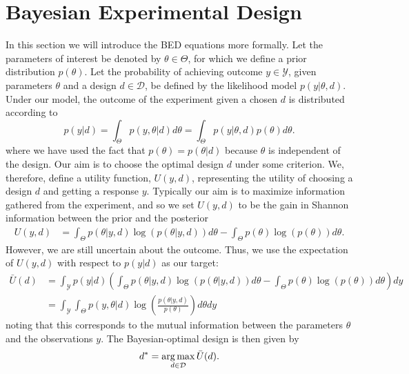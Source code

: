 
\section{Bayesian Experimental Design}
\label{sec:design:bed}

In this section we will introduce the BED equations more formally.
Let the parameters of interest be denoted by $\theta \in \Theta$, for which we define a prior distribution $p(\theta)$.
Let the probability of achieving outcome $y\in\mathcal{Y}$, given parameters $\theta$ 
and a design $d \in \mathcal{D}$, be defined by the likelihood model $p(y | \theta, d)$.
Under our model, the outcome of the experiment given a chosen $d$ is distributed according to
\begin{equation}
\label{eq:marginal_def}
p(y | d) = \int_{\Theta} p(y,\theta | d) d\theta = \int_{\Theta} p(y | \theta, d) p(\theta) d\theta.
\end{equation}
where we have used the fact that $p(\theta)=p(\theta|d)$ because $\theta$ is independent of the design.
Our aim is to choose the optimal design $d$ under some criterion. 
We, therefore, define a utility function, $U(y,d)$, representing the utility of choosing a design $d$ 
and getting a response $y$.
Typically our aim is to maximize information gathered from the experiment, and so we set 
$U(y,d)$ to be the gain in Shannon information between the prior and the posterior
\begin{align}
\label{eq:shannon_inf}
U(y,d) &= \int_{\Theta} p(\theta |y, d) \log(p(\theta |y, d)) d\theta -\int_{\Theta} p(\theta) \log(p(\theta))d\theta.
\end{align}
However, we are still uncertain about the outcome. Thus, we use the expectation of $U(y,d)$ with respect to $p(y | d)$
as our target:
\begin{align}
\bar{U}(d) 
&=\int_{\mathcal{Y}} p(y|d) \left(
\int_{\Theta} p(\theta | y, d)\log(p(\theta |y, d)) d\theta - 
\int_{\Theta} p(\theta) \log(p(\theta)) d\theta \right) dy \nonumber\\
&=\int_{\mathcal{Y}}\int_{\Theta} p(y,\theta | d)\log\left(\frac{p(\theta |y, d)}{p(\theta)}\right)d\theta dy
\label{eq:u_bar_1}
\end{align}
noting that this corresponds to the mutual information between the parameters $\theta$ and
the observations $y$.  The Bayesian-optimal design is then given by
\begin{equation}
\label{eq:d_star}
d^* = \operatorname*{arg\,max}_{d \in \mathcal{D}} \bar{U}(d).
\end{equation}
